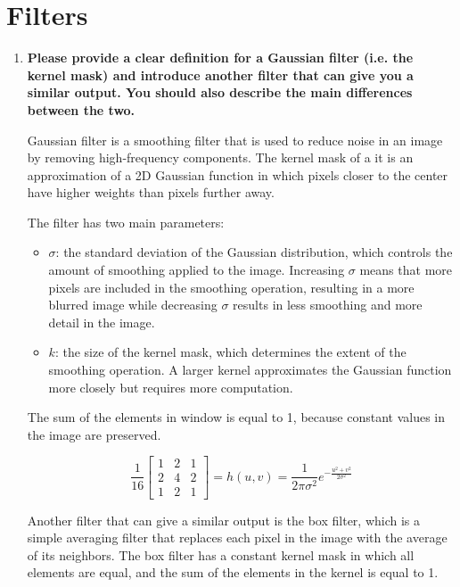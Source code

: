\documentclass[12pt]{article}
\begin{document}
\section{Filters}
\begin{enumerate}
    \item \textbf{Please provide a clear definition for a Gaussian filter (i.e. the kernel mask) and introduce another filter that can give you a similar output.
              You should also describe the main differences between the two.}

          Gaussian filter is a smoothing filter that is used to reduce noise in an image by removing high-frequency components.
          The kernel mask of a it is an approximation of a 2D Gaussian function in which pixels closer to the center have higher weights than pixels further away.

          The filter has two main parameters:
          \begin{itemize}
              \item $\sigma$: the standard deviation of the Gaussian distribution, which controls the amount of smoothing applied to the image.
                    Increasing $\sigma$ means that more pixels are included in the smoothing operation, resulting in a more blurred image while decreasing $\sigma$ results in less smoothing and more detail in the image.
              \item $k$: the size of the kernel mask, which determines the extent of the smoothing operation.
                    A larger kernel approximates the Gaussian function more closely but requires more computation.
          \end{itemize}

          The sum of the elements in window is equal to 1, because constant values in the image are preserved.

          \[\frac{1}{16}
              \begin{bmatrix}
                  1 & 2 & 1 \\
                  2 & 4 & 2 \\
                  1 & 2 & 1
              \end{bmatrix}
              = h(u, v) = \frac{1}{2\pi\sigma^2}e^{-\frac{u^2 + v^2}{2\sigma^2}}
          \]

          Another filter that can give a similar output is the box filter, which is a simple averaging filter that replaces each pixel in the image with the average of its neighbors.
          The box filter has a constant kernel mask in which all elements are equal, and the sum of the elements in the kernel is equal to 1.


\end{enumerate}
\end{document}
